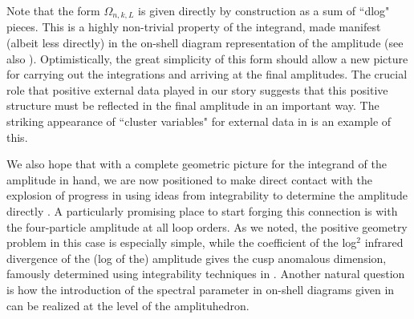 \documentclass[12pt,nohyper,twosided]{JHEP3}
\begin{document}
Note that the form $\Omega_{n,k,L}$ is given directly by
construction as a sum of ``dlog" pieces. This is a highly
non-trivial property of the integrand, made manifest (albeit less
directly) in the on-shell diagram representation of the amplitude
\cite{N6} (see also \cite{Lipstein:2012vs, Lipstein:2013xra}).
 Optimistically, the great simplicity of this form should
allow a new picture for carrying out the integrations and arriving
at the final amplitudes. The crucial role that positive external
data played in our story suggests that this positive structure must
be reflected in the final amplitude in an important way. The
striking appearance of ``cluster variables" for external data in
\cite{posextamp} is an example of this.

We also hope that with a complete geometric picture for the
integrand of the amplitude in hand, we are now positioned to make direct
contact with the explosion of progress in using ideas from
integrability to determine the amplitude directly
\cite{CaronHuot:2011kk,Basso:2013vsa,Basso:2013aha, Dixon:2013eka}. A particularly promising place
to start forging this connection is with the four-particle amplitude
at all loop orders. As we noted, the positive geometry problem in
this case is especially simple, while the coefficient of the log$^2$
infrared divergence of the (log of the)  amplitude gives the cusp
anomalous dimension, famously determined using integrability
techniques in \cite{BS, Beisert:2006ez,Eden:2006rx}. Another natural question is how the introduction of the spectral
parameter in on-shell diagrams given in \cite{Ferro:2013dga,Ferro:2012xw} can be realized at the level of the amplituhedron.
\end{document}
